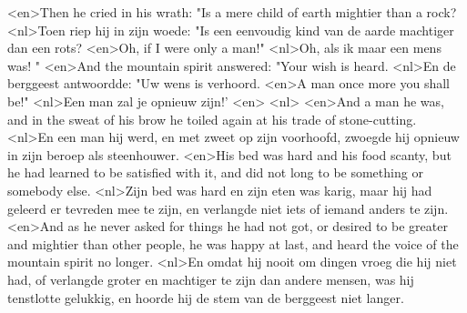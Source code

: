 <en>Then he cried in his wrath: "Is a mere child of earth mightier than a rock?
<nl>Toen riep hij in zijn woede: "Is een eenvoudig kind van de aarde machtiger dan een rots?
<en>Oh, if I were only a man!"
<nl>Oh, als ik maar een mens was! "
<en>And the mountain spirit answered: "Your wish is heard.
<nl>En de berggeest antwoordde: "Uw wens is verhoord.
<en>A man once more you shall be!"
<nl>Een man zal je opnieuw zijn!'
<en>
<nl>
<en>And a man he was, and in the sweat of his brow he toiled again at his trade of stone-cutting.
<nl>En een man hij werd, en met zweet op zijn voorhoofd, zwoegde hij opnieuw in zijn beroep als steenhouwer.
<en>His bed was hard and his food scanty, but he had learned to be satisfied with it, and did not long to be something or somebody else.
<nl>Zijn bed was hard en zijn eten was karig, maar hij had geleerd er tevreden mee te zijn, en verlangde niet iets of iemand anders te zijn.
<en>And as he never asked for things he had not got, or desired to be greater and mightier than other people, he was happy at last, and heard the voice of the mountain spirit no longer.
<nl>En omdat hij nooit om dingen vroeg die hij niet had, of verlangde  groter en machtiger te zijn dan andere mensen, was hij tenstlotte gelukkig, en hoorde hij de stem van de berggeest niet langer.
